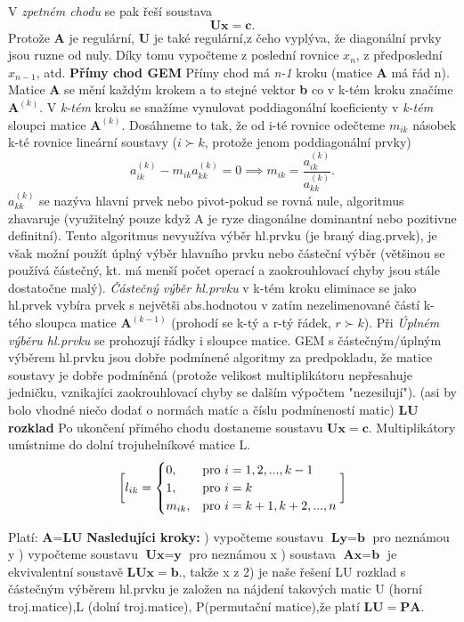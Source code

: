 V \textit{zpetném chodu} se pak řeší soustava $$\textbf{Ux}=\textbf{c}.$$ Protože \textbf{A} je regulární, \textbf{U} je také regulární,z čeho vyplýva, že diagonální prvky jsou ruzne od nuly. Díky tomu vypočteme z poslední rovnice $x_{n}$, z předposlední $x_{n-1}$, atd.
\textbf{Přímy chod GEM}
Přímy chod má \textit{n-1} kroku (matice \textbf{A} má řád n). Matice \textbf{A} se mění každým krokem a to stejné vektor \textbf{b} co v k-tém kroku značíme $\textbf{A}^{(k)}$. V \textit{k-tém} kroku se snažíme vynulovat poddiagonální koeficienty v \textit{k-tém} sloupci matice $\textbf{A}^{(k)}$. Dosáhneme to tak, že od i-té rovnice odečteme $\textit{m}_{ik}$ násobek k-té rovnice lineární soustavy ($i\succ k$, protože jenom poddiagonální prvky)
$$a_{ik}^{(k)}-m_{ik}a_{kk}^{(k)}=0 \implies m_{ik}=\frac{a_{ik}^{(k)}}{a_{kk}^{(k)}}.$$
$a_{kk}^{(k)}$ se nazýva hlavní prvek nebo pivot-pokud se rovná nule, algoritmus zhavaruje (využitelný pouze když A je ryze diagonálne dominantní nebo pozitivne definitní).
\newline Tento algoritmus nevyužíva výběr hl.prvku (je braný diag.prvek), je však možní použít úplný výběr hlavního prvku nebo částeční výběr (většinou se používá částečný, kt. má menší počet operací a zaokrouhlovací chyby jsou stále dostatočne malý).
\newline 
\textit{Částečný výběr hl.prvku} v k-tém kroku eliminace se jako hl.prvek vybíra prvek s největši abs.hodnotou v zatím nezelimenované částí k-tého sloupca matice $\textbf{A}^{(k-1)}$ (prohodí se k-tý a r-tý řádek, $r\succ k$). Při \textit{Úplném výběru hl.prvku} se prohozují řádky i sloupce matice.
\newline GEM s částečným/úplným výběrem hl.prvku jsou dobře podmínené algoritmy za predpokladu, že matice soustavy je dobře podmíněná (protože velikost multiplikátoru nepřesahuje jedničku, vznikajíci zaokrouhlovací chyby se dalším výpočtem "nezesilují"). (asi by bolo vhodné niečo dodať o normách matíc a číslu podmíneností matic)
\textbf{LU rozklad}
Po ukončení přimého chodu dostaneme soustavu $\textbf{Ux}=\textbf{c}.$ Multiplikátory umístnime do dolní trojuhelníkové matice L.
$$
\bigg{[} l_{ik}= 
\begin{cases}
       0, & \text{pro } i=1,2,...,k-1 \\
       1, & \text{pro } i=k \\
        m_{ik}, & \text{pro } i=k+1,k+2,...,n
\end{cases}
\bigg{]}
$$

Platí: \textbf{A}=\textbf{LU}
\newline \textbf{Nasledujíci kroky:}
) vypočteme soustavu $\textbf{Ly}=\textbf{b}$ pro neznámou y 
) vypočteme soustavu $\textbf{Ux}=\textbf{y}$ pro neznámou x
) soustava $\textbf{Ax}=\textbf{b}$ je ekvivalentní soustavě $\textbf{LUx}=\textbf{b}.$, takže x z 2) je naše řešení
\newline LU rozklad s částečným výběrem hl.prvku je založen na nájdení takových matic U (horní troj.matice),L (dolní troj.matice), P(permutační matice),že platí $\textbf{LU}=\textbf{PA}.$

